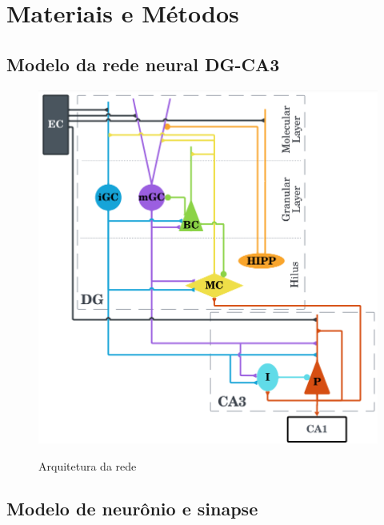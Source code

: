 \chapter{Materiais e Métodos}

\section{Modelo da rede neural DG-CA3}



\begin{figure}
    \centering
    \caption{Arquitetura da rede}
    \includegraphics[scale=0.3]{figuras/arquitetura-rede.png}
    \label{fig:arquitetura-rede}
\end{figure}


\section{Modelo de neurônio e sinapse}




